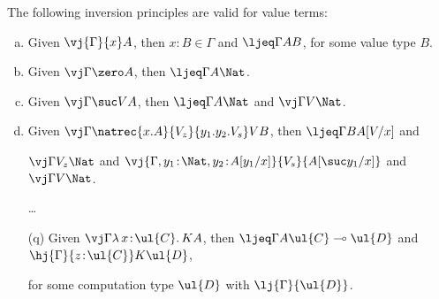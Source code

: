 \begin{proposition}
\label{prop:valueterminversion}
The following inversion principles are valid for value terms:
\begin{enumerate}[(a)]
\item Given $\vj {\Gamma} {x} A$, then $x \!:\! B \in \Gamma$ and $\ljeq \Gamma A B$, for some value type $B$.
\item Given $\vj \Gamma {\zero} A$, then $\ljeq \Gamma A {\Nat}$.
\item Given $\vj \Gamma {\suc V} A$, then $\ljeq \Gamma A {\Nat}$ and $\vj \Gamma V \Nat$.
\item Given $\vj \Gamma {\natrec {x.A} {V_z} {y_1.y_2.V_s} V} {B}$, then $\ljeq \Gamma B {A[V/x]}$ and 

\vspace{-0.2cm}
\hfill $\vj \Gamma {V_z} {\Nat}$ and $\vj {\Gamma, y_1 \!:\! \Nat, y_2 \!:\! A[y_1/x]} {V_s} {A[\suc y_1/x]}$ and $\vj \Gamma V \Nat$.
\item[] \ldots
\item[(q)] Given $\vj \Gamma {\lambda\, x \!:\! \ul{C} .\, K} {A}$, then $\ljeq \Gamma A {\ul{C} \multimap \ul{D}}$ and $\hj {\Gamma} {z \!:\! \ul{C}} K {\ul{D}}$, 

\vspace{-0.2cm}
\hfill for some computation type $\ul{D}$ with $\lj {\Gamma} {\ul{D}}$.

\end{enumerate}
\end{proposition}

